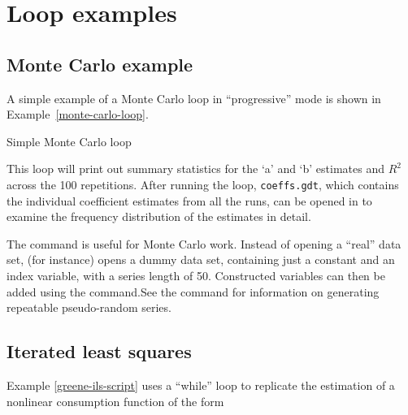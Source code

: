 \section{Loop examples}
\label{loop-examples}


\subsection{Monte Carlo example}
\label{loop-mc-example}

A simple example of a Monte Carlo loop in ``progressive'' mode is
shown in Example~\ref{monte-carlo-loop}.

\begin{script}[htbp]
  \caption{Simple Monte Carlo loop}
  \label{monte-carlo-loop}
\end{script}

This loop will print out summary statistics for the `a' and `b'
estimates and $R^2$ across the 100 repetitions.  After running the
loop, \verb+coeffs.gdt+, which contains the individual coefficient
estimates from all the runs, can be opened in  to examine
the frequency distribution of the estimates in detail.

The command  is useful for Monte Carlo work.  Instead of
opening a ``real'' data set,  (for instance) opens a
dummy data set, containing just a constant and an index variable, with
a series length of 50. Constructed variables can then be added using
the  command.See the  command for information on
generating repeatable pseudo-random series.

\subsection{Iterated least squares}
\label{loop-ils-examples}

Example \ref{greene-ils-script} uses a ``while'' loop to replicate the
estimation of a nonlinear consumption function of the form
	
